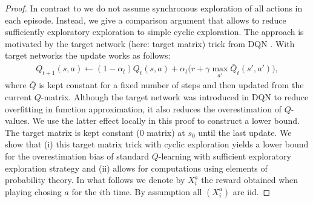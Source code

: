 \documentclass{article}
\theoremstyle{plain}
\theoremstyle{definition}
\theoremstyle{remark}
\begin{document}
\begin{proof}
    In contrast to \cite{VanHasselt:2011} we do not assume synchronous  exploration of all actions in each episode. Instead, we give a comparison argument that allows to reduce sufficiently exploratory exploration to simple cyclic exploration. The approach is motivated by the target network (here: target matrix) trick from DQN \cite{dqn}. With target networks the update works as follows:
     \begin{align*}
        Q_{t+1}(s,a)\leftarrow (1-\alpha_t) Q_t(s,a)+\alpha_t \big(r+\gamma \max_{a'}\bar Q_t(s',a')\big),
    \end{align*}
    where $\bar Q$ is kept constant for a fixed number of steps and then updated from the current $Q$-matrix. Although the target network was introduced in DQN to reduce overfitting in function approximation, it also reduces the overestimation of $Q$-values. We use the latter effect locally in this proof to construct a lower bound. The target matrix is kept constant ($0$ matrix) at $s_0$ until the last update. We show that (i) this target matrix trick with cyclic exploration yields a lower bound for the overestimation bias of standard $Q$-learning with sufficient exploratory  exploration strategy and (ii) allows for computations using elements of probability theory. In what follows we denote by $X_i^a$ the reward obtained when playing chosing $a$ for the $i$th time. By assumption all $(X_i^a)$ are iid.
    

\end{proof}
\end{document}
